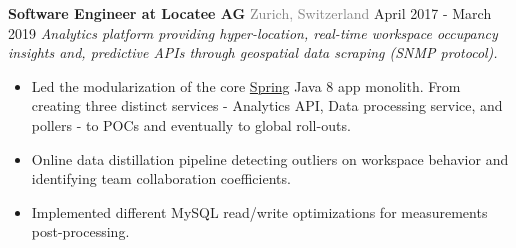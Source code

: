 \documentclass{article}
\begin{document}
        \begin{flushleft}
            \textbf{\large Software Engineer at Locatee AG} {\footnotesize \textcolor{gray}{Zurich, Switzerland}} \hfill \small April 2017 - March 2019  \newline 
        \textit{Analytics platform providing hyper-location, real-time workspace occupancy insights and, predictive APIs through geospatial data scraping (SNMP protocol). }
            \begin{itemize}[label=\raisebox{0.25ex}{\tiny$\bullet$}, leftmargin=1.5em, labelsep=0.3em]
                \item Led the modularization of the core \href{https://spring.io/projects/spring-framework}{Spring} Java 8 app monolith. From creating three distinct services - Analytics API, Data processing service, and pollers - to POCs and eventually to global roll-outs.
                \item Online data distillation pipeline detecting outliers on workspace behavior and identifying team collaboration coefficients.
                \item Implemented different MySQL read/write optimizations for measurements post-processing.
            \end{itemize}
                      \\ [1ex]
        \end{flushleft}
\end{document}
